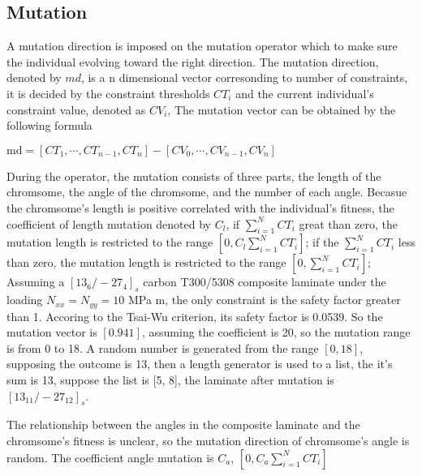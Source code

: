 \subsection{Mutation}
A mutation direction is imposed on the mutation operator which to make sure the individual evolving
toward the right direction. The mutation direction, denoted by $md$, is a n dimensional vector corresonding to
number of constraints, it is decided by the constraint thresholds $CT_i$ and the current individual's
constraint value, denoted as $CV_i$,  The mutation vector can be obtained by the following formula

$\text{md} = [CT_1, \cdots, CT_{n-1}, CT_n] -  [CV_0, \cdots, CV_{n-1}, CV_n]$

During the operator, the mutation consists of three parts, the length of the chromsome, the angle
of the chromsome, and the number of each angle. Becasue the chromsome's length is positive correlated with the individual's
fitness, the coefficient of length mutation denoted by $C_l$, if $\sum_{i=1}^{N}{CT_i}$ great than
zero, the mutation length is restricted to the range $[0,C_l \sum_{i=1}^{N}{CT_i}]$; if the
$\sum_{i=1}^{N}{CT_i}$ less than zero, the mutation length is restricted to the range
$[0,\sum_{i=1}^{N}{CT_i}]$; Assuming a $[13_6/-27_4]_s$ carbon T300/5308 composite laminate under
the loading $N_{xx} = N_{yy} = 10$ MPa m, the only constraint is the safety factor greater than 1.
Accoring to the Tsai-Wu criterion, its safety factor is 0.0539. So the mutation vector is $[0.941]$,
assuming the coefficient is 20, so the mutation range is from 0 to 18. A random number is generated
from the range $[0, 18]$, supposing the outcome is 13, then a length generator is used to a list,
the it's sum is 13, suppose the list is [5, 8], the laminate after mutation is $[13_{11}/-27_{12}]_s$.


The relationship between the angles in the composite laminate and the chromsome's fitness is
unclear, so the mutation direction of chromsome's angle is random. The coefficient angle mutation is
$C_a$, $[0,C_a \sum_{i=1}^{N}{CT_i}]$

